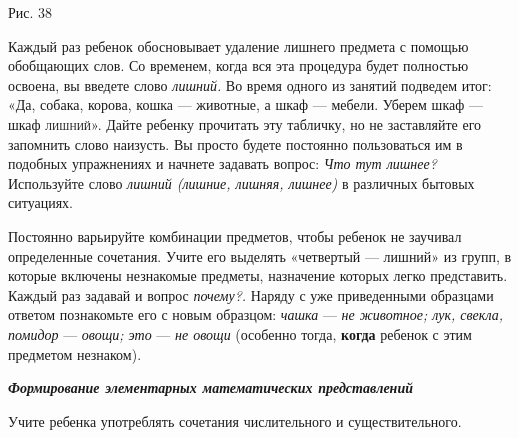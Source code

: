 \documentclass[a5paper]{book}
\renewcommand{\emph}[1]{\textit{#1}}
\begin{document}
Рис. 38

Каждый раз ребенок обосновывает удаление лишнего предмета с помощью
обобщающих слов. Со временем, когда вся эта процедура будет полностью
освоена, вы введете слово \emph{лишний.} Во время одного из занятий
подведем итог: «Да, собака, корова, кошка --- животные, а шкаф ---
мебели. Уберем шкаф --- шкаф \textsc{лишний».} Дайте ребенку прочитать
эту табличку, но не заставляйте его запомнить слово наизусть. Вы просто
будете постоянно пользоваться им в подобных упражнениях и начнете
задавать вопрос: \emph{Что тут лишнее?} Используйте слово \emph{лишний
(лишние, лишняя, лишнее)} в различных бытовых ситуациях.

Постоянно варьируйте комбинации предметов, чтобы ребенок не заучивал
определенные сочетания. Учите его выделять «четвертый --- лишний» из
групп, в которые включены незнакомые предметы, назначение которых легко
представить. Каждый раз задавай и вопрос \emph{почему?.} Наряду с уже
приведенными образцами ответом познакомьте его с новым образцом:
\emph{чашка} --- \emph{не животное; лук, свекла, помидор} ---
\emph{овощи; это} --- \emph{не овощи} (особенно тогда, \textbf{когда}
ребенок с этим предметом незнаком).

\emph{\textbf{Формирование элементарных математических представлений}}

Учите ребенка употреблять сочетания числительного и существительного.
\end{document}
